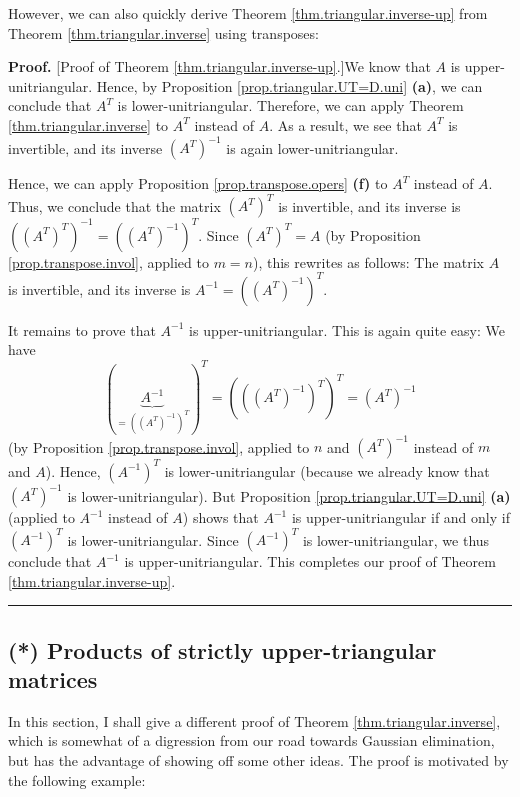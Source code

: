 \documentclass[numbers=enddot,12pt,final,onecolumn,notitlepage]{scrartcl}%
\theoremstyle{definition}
\newenvironment{proof}[1][Proof]{\noindent\textbf{#1.} }{\ \rule{0.5em}{0.5em}}
\begin{document}
However, we can also quickly derive Theorem \ref{thm.triangular.inverse-up}
from Theorem \ref{thm.triangular.inverse} using transposes:

\begin{proof}
[Proof of Theorem \ref{thm.triangular.inverse-up}.]We know that $A$ is
upper-unitriangular. Hence, by Proposition \ref{prop.triangular.UT=D.uni}
\textbf{(a)}, we can conclude that $A^{T}$ is lower-unitriangular. Therefore,
we can apply Theorem \ref{thm.triangular.inverse} to $A^{T}$ instead of $A$.
As a result, we see that $A^{T}$ is invertible, and its inverse $\left(
A^{T}\right)  ^{-1}$ is again lower-unitriangular.

Hence, we can apply Proposition \ref{prop.transpose.opers} \textbf{(f)} to
$A^{T}$ instead of $A$. Thus, we conclude that the matrix $\left(
A^{T}\right)  ^{T}$ is invertible, and its inverse is $\left(  \left(
A^{T}\right)  ^{T}\right)  ^{-1}=\left(  \left(  A^{T}\right)  ^{-1}\right)
^{T}$. Since $\left(  A^{T}\right)  ^{T}=A$ (by Proposition
\ref{prop.transpose.invol}, applied to $m=n$), this rewrites as follows: The
matrix $A$ is invertible, and its inverse is $A^{-1}=\left(  \left(
A^{T}\right)  ^{-1}\right)  ^{T}$.

It remains to prove that $A^{-1}$ is upper-unitriangular. This is again quite
easy: We have%
\[
\left(  \underbrace{A^{-1}}_{=\left(  \left(  A^{T}\right)  ^{-1}\right)
^{T}}\right)  ^{T}=\left(  \left(  \left(  A^{T}\right)  ^{-1}\right)
^{T}\right)  ^{T}=\left(  A^{T}\right)  ^{-1}%
\]
(by Proposition \ref{prop.transpose.invol}, applied to $n$ and $\left(
A^{T}\right)  ^{-1}$ instead of $m$ and $A$). Hence, $\left(  A^{-1}\right)
^{T}$ is lower-unitriangular (because we already know that $\left(
A^{T}\right)  ^{-1}$ is lower-unitriangular). But Proposition
\ref{prop.triangular.UT=D.uni} \textbf{(a)} (applied to $A^{-1}$ instead of
$A$) shows that $A^{-1}$ is upper-unitriangular if and only if $\left(
A^{-1}\right)  ^{T}$ is lower-unitriangular. Since $\left(  A^{-1}\right)
^{T}$ is lower-unitriangular, we thus conclude that $A^{-1}$ is
upper-unitriangular. This completes our proof of Theorem
\ref{thm.triangular.inverse-up}.
\end{proof}

\subsection{(*) Products of strictly upper-triangular matrices}

In this section, I shall give a different proof of Theorem
\ref{thm.triangular.inverse}, which is somewhat of a digression from our road
towards Gaussian elimination, but has the advantage of showing off some other
ideas. The proof is motivated by the following example:
\end{document}

